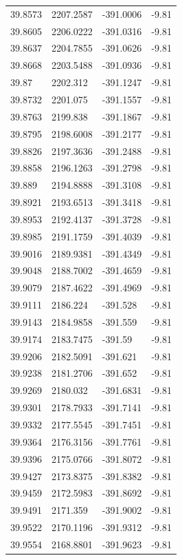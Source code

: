 \begin{table}[H]
\begin{tabular}{llll}
39.8573 & 2207.2587 & -391.0006 & -9.81 \\
39.8605 & 2206.0222 & -391.0316 & -9.81 \\
39.8637 & 2204.7855 & -391.0626 & -9.81 \\
39.8668 & 2203.5488 & -391.0936 & -9.81 \\
39.87 & 2202.312 & -391.1247 & -9.81 \\
39.8732 & 2201.075 & -391.1557 & -9.81 \\
39.8763 & 2199.838 & -391.1867 & -9.81 \\
39.8795 & 2198.6008 & -391.2177 & -9.81 \\
39.8826 & 2197.3636 & -391.2488 & -9.81 \\
39.8858 & 2196.1263 & -391.2798 & -9.81 \\
39.889 & 2194.8888 & -391.3108 & -9.81 \\
39.8921 & 2193.6513 & -391.3418 & -9.81 \\
39.8953 & 2192.4137 & -391.3728 & -9.81 \\
39.8985 & 2191.1759 & -391.4039 & -9.81 \\
39.9016 & 2189.9381 & -391.4349 & -9.81 \\
39.9048 & 2188.7002 & -391.4659 & -9.81 \\
39.9079 & 2187.4622 & -391.4969 & -9.81 \\
39.9111 & 2186.224 & -391.528 & -9.81 \\
39.9143 & 2184.9858 & -391.559 & -9.81 \\
39.9174 & 2183.7475 & -391.59 & -9.81 \\
39.9206 & 2182.5091 & -391.621 & -9.81 \\
39.9238 & 2181.2706 & -391.652 & -9.81 \\
39.9269 & 2180.032 & -391.6831 & -9.81 \\
39.9301 & 2178.7933 & -391.7141 & -9.81 \\
39.9332 & 2177.5545 & -391.7451 & -9.81 \\
39.9364 & 2176.3156 & -391.7761 & -9.81 \\
39.9396 & 2175.0766 & -391.8072 & -9.81 \\
39.9427 & 2173.8375 & -391.8382 & -9.81 \\
39.9459 & 2172.5983 & -391.8692 & -9.81 \\
39.9491 & 2171.359 & -391.9002 & -9.81 \\
39.9522 & 2170.1196 & -391.9312 & -9.81 \\
39.9554 & 2168.8801 & -391.9623 & -9.81 \\

\end{tabular}
\end{table}
